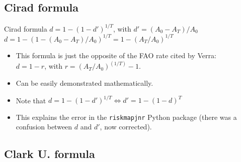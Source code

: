 \documentclass[10pt,table,dvipsnames,compress]{beamer}
\begin{document}
\subsection{Cirad formula}
\label{sec:orgb38bc0a}

\begin{frame}[label={sec:orgc0386a6},fragile]{Cirad formula}
 \centering \alert{\alert{\(d = 1 - (1 - d')^{1/T}\)}}, with \(d' = (A_0-A_T)/A_0\) \\
\(d = 1 - (1 - (A_0-A_T)/A_0)^{1/T} = 1 - (A_T/A_0)^{1/T}\)
\vspace{0.5cm}

\begin{itemize}
\item This formula is just the \alert{\alert{opposite}} of the FAO rate cited by Verra:\\
\(d = 1 - r\), with \(r = (A_T/A_0)^{(1/T)}-1\).
\item Can be easily demonstrated mathematically.
\item Note that \(d = 1 - (1 - d')^{1/T} \Leftrightarrow d' = 1 - (1 - d)^{T}\)
\item This explains the error in the \texttt{riskmapjnr} Python package (there was a confusion between \(d\) and \(d'\), now corrected).
\end{itemize}
\end{frame}

\subsection{Clark U. formula}
\label{sec:orgad53acc}
\end{document}

